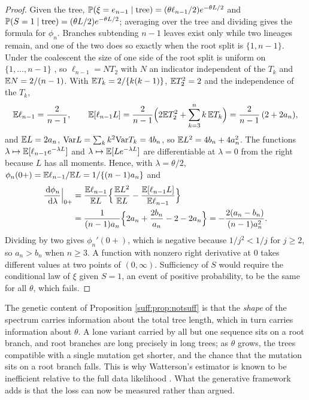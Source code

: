 \begin{proof}
Given the tree, $\mathbb{P}(\xi=e_{n-1}\mid\mathrm{tree})=(\theta\ell_{n-1}/2)e^{-\theta L/2}$ and
$\mathbb{P}(S=1\mid\mathrm{tree})=(\theta L/2)e^{-\theta L/2}$; averaging over the tree and dividing
gives the formula for $\phi_n$. Branches subtending $n-1$ leaves exist only while two lineages
remain, and one of the two does so exactly when the root split is $\{1,n-1\}$. Under the
coalescent the size of one side of the root split is uniform on $\{1,\dots,n-1\}$
\citep{suff:kingman1982}, so $\ell_{n-1}=NT_2$ with $N$ an indicator independent of the
$T_k$ and $\mathbb{E} N=2/(n-1)$. With $\mathbb{E} T_k=2/\{k(k-1)\}$, $\mathbb{E} T_2^2=2$ and the independence of the
$T_k$,
\[
\mathbb{E}\ell_{n-1}=\frac{2}{n-1},\qquad
\mathbb{E}[\ell_{n-1}L]=\frac{2}{n-1}\Big(2\mathbb{E} T_2^2+\sum_{k=3}^{n}k\,\mathbb{E} T_k\Big)
=\frac{2}{n-1}\,(2+2a_n),
\]
and $\mathbb{E} L=2a_n$, $\mathrm{Var} L=\sum_k k^2\mathrm{Var} T_k=4b_n$, so $\mathbb{E} L^2=4b_n+4a_n^2$. The functions
$\lambda\mapsto\mathbb{E}[\ell_{n-1}e^{-\lambda L}]$ and $\lambda\mapsto\mathbb{E}[Le^{-\lambda L}]$ are
differentiable at $\lambda=0$ from the right because $L$ has all moments. Hence, with
$\lambda=\theta/2$, $\phi_n(0+)=\mathbb{E}\ell_{n-1}/\mathbb{E} L=1/\{(n-1)a_n\}$ and
\begin{align*}
\frac{\,\mathrm{d}\phi_n}{\,\mathrm{d}\lambda}\Big|_{0+}
&=\frac{\mathbb{E}\ell_{n-1}}{\mathbb{E} L}\Big\{\frac{\mathbb{E} L^2}{\mathbb{E} L}-\frac{\mathbb{E}[\ell_{n-1}L]}{\mathbb{E}\ell_{n-1}}\Big\}\\
&=\frac{1}{(n-1)a_n}\Big\{2a_n+\frac{2b_n}{a_n}-2-2a_n\Big\}
=-\frac{2(a_n-b_n)}{(n-1)a_n^2}.
\end{align*}
Dividing by two gives $\phi_n'(0+)$, which is negative because $1/j^2<1/j$ for $j\ge2$, so
$a_n>b_n$ when $n\ge3$. A function with nonzero right derivative at $0$ takes different values
at two points of $(0,\infty)$. Sufficiency of $S$ would require the conditional law of $\xi$
given $S=1$, an event of positive probability, to be the same for all $\theta$, which fails.
\end{proof}

The genetic content of Proposition \ref{suff:prop:notsuff} is that the \emph{shape} of the
spectrum carries information about the total tree length, which in turn carries information
about $\theta$. A lone variant carried by all but one sequence sits on a root branch, and
root branches are long precisely in long trees; as $\theta$ grows, the trees compatible with a
single mutation get shorter, and the chance that the mutation sits on a root branch falls.
This is why Watterson's estimator is known to be inefficient relative to the full data
likelihood \citep{suff:felsenstein1992,suff:fuli1993}. What the generative framework adds is
that the loss can now be measured rather than argued.

